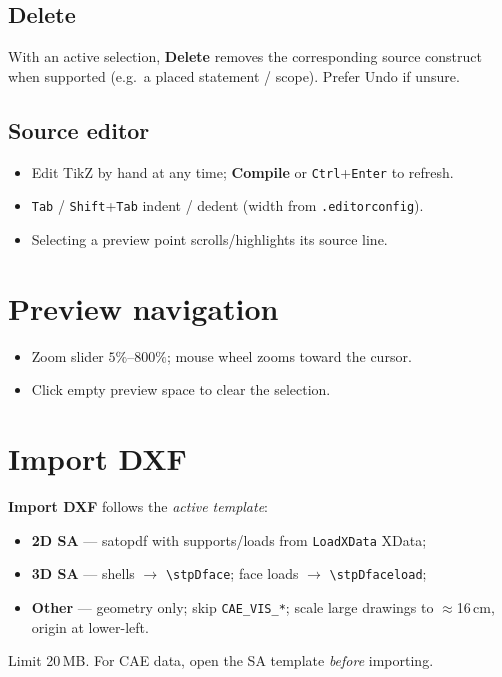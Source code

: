 \documentclass[a4paper]{ltxdoc}
\newcommand{\ui}[1]{\textbf{#1}}
\newcommand{\key}[1]{\texttt{#1}}
\begin{document}
\subsection{Delete}
With an active selection, \ui{Delete} removes the corresponding source
construct when supported (e.g.\ a placed statement / scope).  Prefer
Undo if unsure.

\subsection{Source editor}
\begin{itemize}[nosep]
  \item Edit TikZ by hand at any time; \ui{Compile} or
        \key{Ctrl}+\key{Enter} to refresh.
  \item \key{Tab} / \key{Shift}+\key{Tab} indent / dedent (width from
        \texttt{.editorconfig}).
  \item Selecting a preview point scrolls/highlights its source line.
\end{itemize}

\section{Preview navigation}

\begin{itemize}[nosep]
  \item Zoom slider $5\%$--$800\%$; mouse wheel zooms toward the cursor.
  \item Click empty preview space to clear the selection.
\end{itemize}

\section{Import DXF}

\ui{Import DXF} follows the \emph{active template}:

\begin{itemize}[nosep]
  \item \textbf{2D SA} --- \textsf{satopdf} with supports/loads from
        \texttt{LoadXData} XData;
  \item \textbf{3D SA} --- shells $\rightarrow$
        \texttt{\textbackslash stpDface}; face loads $\rightarrow$
        \texttt{\textbackslash stpDfaceload};
  \item \textbf{Other} --- geometry only; skip \texttt{CAE\_VIS\_*};
        scale large drawings to $\approx$16\,cm, origin at lower-left.
\end{itemize}
Limit 20\,MB.  For CAE data, open the SA template \emph{before} importing.
\end{document}
